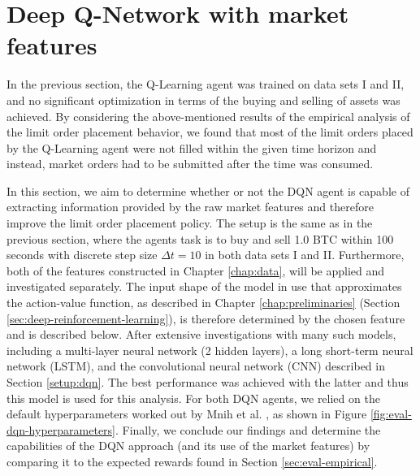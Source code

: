 \section{Deep Q-Network with market features}
\label{sec:eval-dqn}
In the previous section, the Q-Learning agent was trained on data sets I and II, and no significant optimization in terms of the buying and selling of assets was achieved.
By considering the above-mentioned results of the empirical analysis of the limit order placement behavior, we found that most of the limit orders placed by the Q-Learning agent were not filled within the given time horizon and instead, market orders had to be submitted after the time was consumed.

In this section, we aim to determine whether or not the DQN agent is capable of extracting information provided by the raw market features and therefore improve the limit order placement policy.
The setup is the same as in the previous section, where the agents task is to buy and sell 1.0 BTC within 100 seconds with discrete step size $\Delta{t}=10$ in both data sets I and II.
Furthermore, both of the features constructed in Chapter \ref{chap:data}, will be applied and investigated separately.
The input shape of the model in use that approximates the action-value function, as described in Chapter \ref{chap:preliminaries} (Section \ref{sec:deep-reinforcement-learning}), is therefore determined by the chosen feature and is described below.
After extensive investigations with many such models, including a multi-layer neural network\cite{svozil1997introduction} (2 hidden layers), a long short-term neural network (LSTM)\cite{gers1999learning}, and the convolutional neural network (CNN) described in Section \ref{setup:dqn}.
The best performance was achieved with the latter and thus this model is used for this analysis.
For both DQN agents, we relied on the default hyperparameters worked out by Mnih et al. \cite{mnih2015human}, as shown in Figure \ref{fig:eval-dqn-hyperparameters}.
Finally, we conclude our findings and determine the capabilities of the DQN approach (and its use of the market features) by comparing it to the expected rewards found in Section \ref{sec:eval-empirical}.
